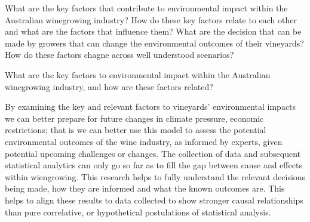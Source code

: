 What are the key factors that contribute to environmental impact within the Australian winegrowing industry?
How do these key factors relate to each other and what are the factors that influence them?
What are the decision that can be made by growers that can change the environmental outcomes of their vineyards?
How do these factors chagne across well understood scenarios?

What are the key factors to environmental impact within the Australian winegrowing industry, and how are these factors related?

By examining the key and relevant factors to vineyards' environmental impacts we can better prepare for future changes in climate pressure, economic restrictions; that is we can better use this model to assess the potential environmental outcomes of the wine industry, as informed by experts, given potential upcoming challenges or changes.
The collection of data and subsequent statistical analytics can only go so far as to fill the gap between cause and effects within wiengrowing. This research helps to fully understand the relevant decisions being made, how they are informed and what the known outcomes are. This helps to align these results to data collected to show stronger causal relationships than pure correlative, or hypothetical postulations of statistical analysis.

%
% 


%

%

